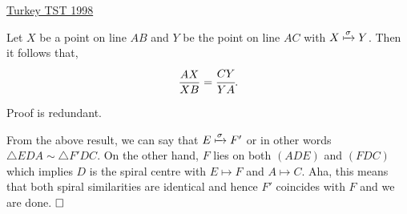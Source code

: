 \begin{problem}{9}{\href{https://artofproblemsolving.com/community/q2h449171p35492771}{Turkey TST 1998}}
\begin{numsolution}{2}
	\begin{proposition}{1} Let $X$ be a point on line $AB$ and $Y$ be the point on line $AC$ with $X\xmapsto{\sigma}Y$. Then it follows that,
$$\frac{AX}{XB}=\cfrac{CY}{YA}.$$
	\end{proposition}
	\noindent Proof is redundant.

	\par From the above result, we can say that $E\xmapsto{\sigma} F'$ or in other words $\triangle EDA\sim \triangle F'DC$. On the other hand, $F$ lies on both $(ADE)$ and $(FDC)$ which implies $D$ is the spiral centre with $E\mapsto F$ and $A\mapsto C$. Aha, this means that both spiral similarities are identical and hence $F'$ coincides with $F$ and we are done. $\qedwhite$
	\end{numsolution}
\end{problem}
	
